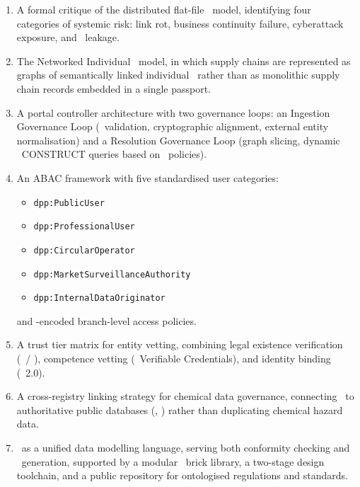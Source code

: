 \begin{enumerate}
\item A formal critique of the distributed flat-file \DPP\ model, identifying
four categories of systemic risk: link rot, business continuity failure,
cyberattack exposure, and \IP\ leakage.

\item The Networked Individual \DPP\ model, in which supply chains are
represented as graphs of semantically linked individual \DPPs\ rather than as
monolithic supply chain records embedded in a single passport.

\item A portal controller architecture with two governance loops: an Ingestion
Governance Loop (\SHACL\ validation, cryptographic alignment, external entity
normalisation) and a Resolution Governance Loop (graph slicing, dynamic \SPARQL\
CONSTRUCT queries based on \ABAC\ policies).

\item An ABAC framework with five standardised user categories:
\begin{itemize}
\item \texttt{dpp:PublicUser}
\item \texttt{dpp:ProfessionalUser}
\item \texttt{dpp:CircularOperator}
\item \texttt{dpp:MarketSurveillanceAuthority}
\item \texttt{dpp:InternalDataOriginator}
\end{itemize}
and \ODRL-encoded branch-level access policies.

\item A trust tier matrix for entity vetting, combining legal existence
verification (\EORI\ / \VIES), competence vetting (\WthreeC\ Verifiable
Credentials), and identity binding (\eIDAS~2.0).

\item A cross-registry linking strategy for chemical data governance, connecting
\DPPs\ to authoritative public databases (\ECHA, \PubChem) rather than
duplicating chemical hazard data.

\item \SHACL\ as a unified data modelling language, serving both conformity
checking and \GUI\ generation, supported by a modular \SHACL\ brick library, a
two-stage design toolchain, and a public repository for ontologised regulations
and standards.
\end{enumerate}

